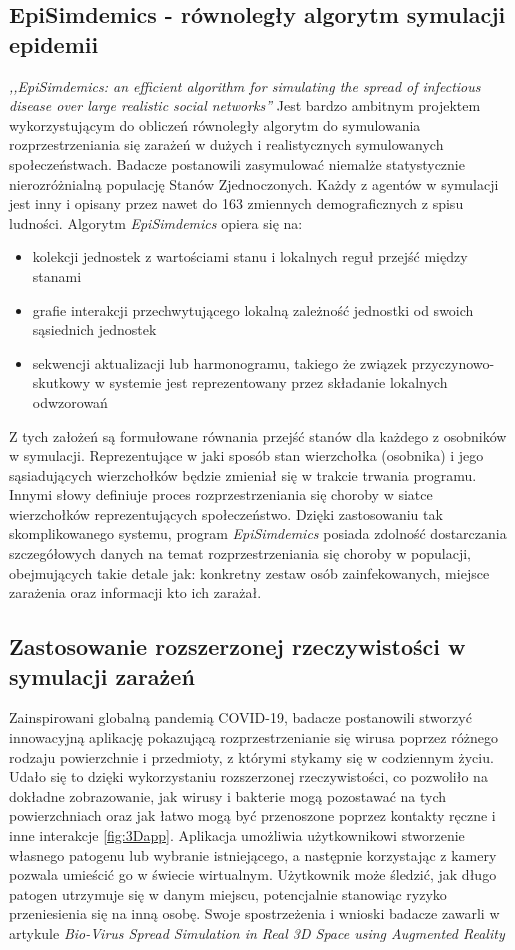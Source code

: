 \subsection{\textbf{EpiSimdemics - równoległy algorytm symulacji epidemii}}
\textit{,,EpiSimdemics: an efficient algorithm for simulating the spread of infectious disease over large realistic social networks''} \cite{bib:konferencja} Jest bardzo ambitnym projektem wykorzystującym do obliczeń równoległy algorytm do symulowania rozprzestrzeniania się zarażeń w dużych i realistycznych symulowanych społeczeństwach. Badacze postanowili zasymulować niemalże statystycznie nierozróżnialną populację Stanów Zjednoczonych. Każdy z agentów w symulacji jest inny i opisany przez nawet do 163 zmiennych demograficznych z spisu ludności. Algorytm \textit{EpiSimdemics} opiera się na:
\begin{itemize}
	\item kolekcji jednostek z wartościami stanu i lokalnych reguł przejść między stanami
	\item grafie interakcji przechwytującego lokalną zależność jednostki od swoich sąsiednich jednostek
	\item sekwencji aktualizacji lub harmonogramu, takiego że związek przyczynowo-skutkowy w systemie jest 	reprezentowany przez składanie lokalnych odwzorowań
\end{itemize}
Z tych założeń są formułowane równania przejść stanów dla każdego z osobników w symulacji. Reprezentujące w jaki sposób stan wierzchołka (osobnika) i jego sąsiadujących wierzchołków będzie zmieniał się w trakcie trwania programu. Innymi słowy definiuje proces rozprzestrzeniania się choroby w siatce wierzchołków reprezentujących społeczeństwo.
	Dzięki zastosowaniu tak skomplikowanego systemu, program \textit{EpiSimdemics} posiada zdolność dostarczania szczegółowych danych na temat rozprzestrzeniania się choroby w populacji, obejmujących takie detale jak: konkretny zestaw osób zainfekowanych, miejsce zarażenia oraz informacji kto ich zarażał.
\subsection{\textbf{Zastosowanie rozszerzonej rzeczywistości w symulacji zarażeń}}

Zainspirowani globalną pandemią COVID-19, badacze postanowili stworzyć innowacyjną aplikację pokazującą rozprzestrzenianie się wirusa poprzez różnego rodzaju powierzchnie i przedmioty, z którymi stykamy się w codziennym życiu. Udało się to dzięki wykorzystaniu rozszerzonej rzeczywistości, co pozwoliło na dokładne zobrazowanie, jak wirusy i bakterie mogą pozostawać na tych powierzchniach oraz jak łatwo mogą być przenoszone poprzez kontakty ręczne i inne interakcje \ref{fig:3Dapp}. Aplikacja umożliwia użytkownikowi stworzenie własnego patogenu lub wybranie istniejącego, a następnie korzystając z kamery pozwala umieścić go w świecie wirtualnym. Użytkownik może śledzić, jak długo patogen utrzymuje się w danym miejscu, potencjalnie stanowiąc ryzyko przeniesienia się na inną osobę. Swoje spostrzeżenia i wnioski badacze zawarli w artykule \textit{Bio-Virus Spread Simulation in Real 3D Space using Augmented Reality} \cite{bib:artykul2}


